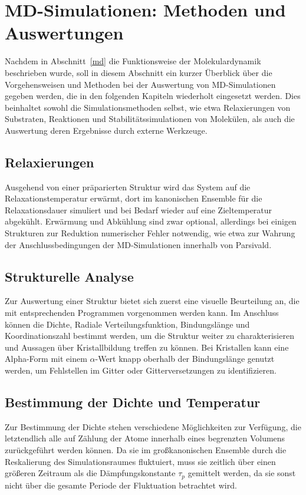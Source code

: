 \section{MD-Simulationen: Methoden und Auswertungen}
\label{mdmethods}

Nachdem in Abschnitt~\ref{md} die Funktionsweise der Molekulardynamik beschrieben wurde, soll in diesem Abschnitt ein kurzer Überblick über die Vorgehensweisen und Methoden bei der Auswertung von MD-Simulationen gegeben werden, die in den folgenden Kapiteln wiederholt eingesetzt werden.
Dies beinhaltet sowohl die Simulationsmethoden selbst, wie etwa Relaxierungen von Substraten, Reaktionen und Stabilitätssimulationen von Molekülen, als auch die Auswertung deren Ergebnisse durch externe Werkzeuge.

\subsection{Relaxierungen}

Ausgehend von einer präparierten Struktur wird das System auf die Relaxationstemperatur erwärmt, dort im kanonischen Ensemble für die Relaxationsdauer simuliert und bei Bedarf wieder auf eine Zieltemperatur abgekühlt.
Erwärmung und Abkühlung sind zwar optional, allerdings bei einigen Strukturen zur Reduktion numerischer Fehler notwendig, wie etwa zur Wahrung der Anschlussbedingungen der MD-Simulationen innerhalb von Parsivald.

\subsection{Strukturelle Analyse}

Zur Auswertung einer Struktur bietet sich zuerst eine visuelle Beurteilung an, die mit entsprechenden Programmen vorgenommen werden kann.
Im Anschluss können die Dichte, Radiale Verteilungsfunktion, Bindungslänge und Koordinationszahl bestimmt werden, um die Struktur weiter zu charakterisieren und Aussagen über Kristallbildung treffen zu können.
Bei Kristallen kann eine Alpha-Form mit einem $\alpha$-Wert knapp oberhalb der Bindungslänge genutzt werden, um Fehlstellen im Gitter oder Gitterversetzungen zu identifizieren.

\subsection{Bestimmung der Dichte und Temperatur}

Zur Bestimmung der Dichte stehen verschiedene Möglichkeiten zur Verfügung, die letztendlich alle auf Zählung der Atome innerhalb eines begrenzten Volumens zurückgeführt werden können.
Da sie im großkanonischen Ensemble durch die Reskalierung des Simulationsraumes fluktuiert, muss sie zeitlich über einen größeren Zeitraum als die Dämpfungskonstante $\tau_p$ gemittelt werden, da sie sonst nicht über die gesamte Periode der Fluktuation betrachtet wird.

